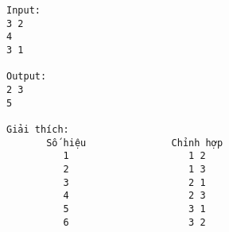 \begin{verbatim}
Input:
3 2 
4
3 1

Output:
2 3
5

Giải thích:
       Số hiệu               Chỉnh hợp
          1                     1 2
          2                     1 3
          3                     2 1
          4                     2 3
          5                     3 1
          6                     3 2

\end{verbatim}